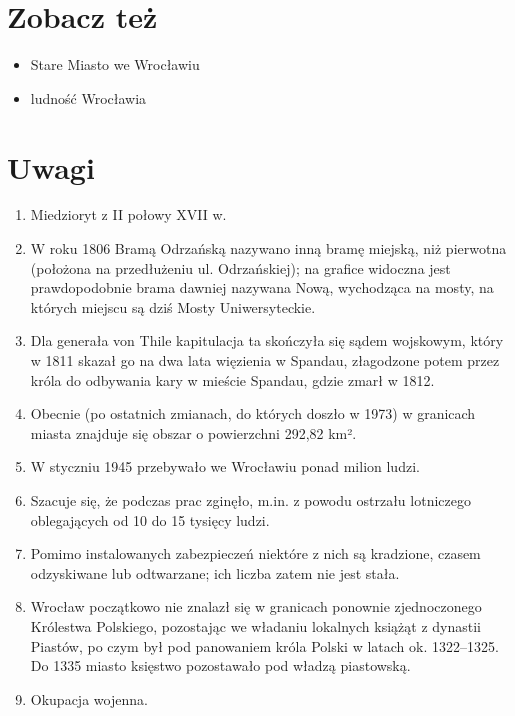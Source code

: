 \documentclass{article}
\begin{document}
\section {Zobacz też}

\begin{itemize}
  \item Stare Miasto we Wrocławiu
  \item ludność Wrocławia
\end{itemize}

\section {Uwagi}

   \begin{enumerate}[label=(\alph*)]
     \item Miedzioryt z II połowy XVII w.\label{fig: [a]}
     \item W roku 1806 Bramą Odrzańską nazywano inną bramę miejską, niż pierwotna (położona na przedłużeniu ul. Odrzańskiej); na grafice widoczna jest prawdopodobnie brama dawniej nazywana Nową, wychodząca na mosty, na których miejscu są dziś Mosty Uniwersyteckie.\label{fig: [b]}
     \item Dla generała von Thile kapitulacja ta skończyła się sądem wojskowym, który w 1811 skazał go na dwa lata więzienia w Spandau, złagodzone potem przez króla do odbywania kary w mieście Spandau, gdzie zmarł w 1812.\label{fig: [c]}
     \item Obecnie (po ostatnich zmianach, do których doszło w 1973) w granicach miasta znajduje się obszar o powierzchni 292,82 km².\label{fig: [d]}
     \item W styczniu 1945 przebywało we Wrocławiu ponad milion ludzi.\label{fig: [e]}
     \item Szacuje się, że podczas prac zginęło, m.in. z powodu ostrzału lotniczego oblegających od 10 do 15 tysięcy ludzi.\label{fig: [f]}
     \item Pomimo instalowanych zabezpieczeń niektóre z nich są kradzione, czasem odzyskiwane lub odtwarzane; ich liczba zatem nie jest stała.\label{fig: [g]}
     \item  Wrocław początkowo nie znalazł się w granicach ponownie zjednoczonego Królestwa Polskiego, pozostając we władaniu lokalnych książąt z dynastii Piastów, po czym był pod panowaniem króla Polski w latach ok. 1322–1325. Do 1335 miasto księstwo pozostawało pod władzą piastowską.\label{fig: [h]}
     \item Okupacja wojenna.\label{fig: [i]}
 \end{enumerate}
\end{document}
